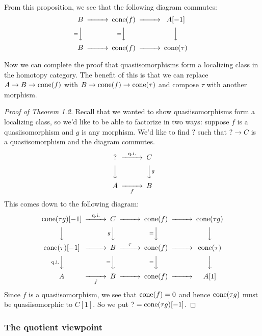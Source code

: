 From this proposition, we see that the following diagram commutes:
\begin{equation*}
    \begin{CD}
        B @>>> \cone(f) @>>> A[-1] \\
          @V=VV @V=VV @VVV \\
        B @>>> \cone(f) @>>> \cone(\tau)
    \end{CD}
\end{equation*}

Now we can complete the proof that quasiisomorphisms form a localizing class in the homotopy category. The benefit of this is that we can replace $A\to B\to\operatorname{cone}(f)$ with $B\to\operatorname{cone}(f)\to\operatorname{cone}(\tau)$ and compose $\tau$ with another morphism.
\begin{proof}[Proof of Theorem 1.2]
    Recall that we wanted to show quasiisomorphisms form a localizing class, so we'd like to be able to factorize in two ways: suppose $f$ is a quasiisomorphism and $g$ is any morphism. We'd like to find $?$ such that $?\to C$ is a quasiisomorphism and the diagram commutes.
    \begin{equation*}
        \begin{CD}
            ? @> \qi>> C \\
            @VVV @VVgV \\
            A @>>f> B
        \end{CD}
    \end{equation*}
    This comes down to the following diagram:
    \begin{equation*}
        \begin{CD}
            \cone(\tau g)[-1] @>\qi>> C @>>> \cone(f) @>>> \cone(\tau g) \\
              @VVV @VgVV @V=VV @VVV \\
            \cone(\tau)[-1] @>>> B @>\tau>> \cone(f) @>>> \cone(\tau) \\
              @V\qi VV @V=VV @V=VV @VVV \\
            A @>>f> B @>>> \cone(f) @>>> A[1]
        \end{CD}
    \end{equation*}
    Since $f$ is a quasiisomorphism, we see that $\operatorname{cone}(f)=0$ and hence $\operatorname{cone}(\tau g)$ must be quasiisomorphic to $C[1]$. So we put $?=\operatorname{cone}(\tau g)[-1]$.
\end{proof}

\subsubsection{The quotient viewpoint}

